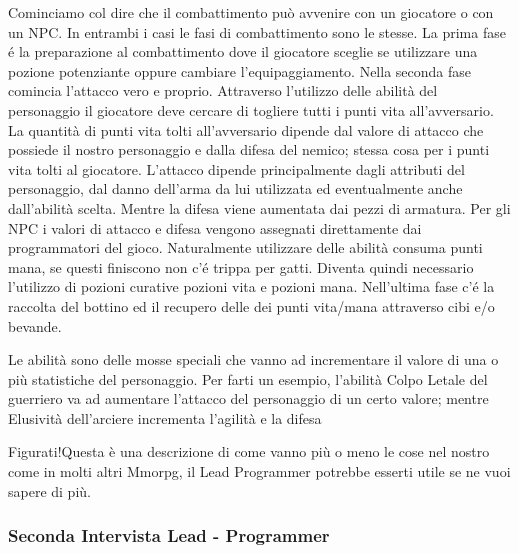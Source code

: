 \begin{description}[style=nextline]
	\item[Quando si combatte, cosa succede?] Cominciamo col dire che il combattimento pu\`{o} avvenire con un giocatore o con un NPC. In entrambi i casi le fasi di combattimento sono le stesse. La prima fase \'{e} la preparazione al combattimento dove il giocatore sceglie se utilizzare una pozione potenziante oppure cambiare l'equipaggiamento. Nella seconda fase comincia l'attacco vero e proprio. Attraverso l'utilizzo delle abilit\`{a} del personaggio il giocatore deve cercare di togliere tutti i punti vita all'avversario. La quantit\`{a} di punti vita tolti all'avversario dipende dal valore di attacco che possiede il nostro personaggio e dalla difesa del nemico; stessa cosa per i punti vita tolti al giocatore. L'attacco dipende principalmente dagli attributi del personaggio, dal danno dell'arma da lui utilizzata ed eventualmente anche dall'abilit\`{a} scelta. Mentre la difesa viene aumentata dai pezzi di armatura. Per gli NPC i valori di attacco e difesa vengono assegnati direttamente dai programmatori del gioco. Naturalmente utilizzare delle abilit\`{a} consuma punti mana, se questi finiscono non c'\'{e} trippa per gatti. Diventa quindi necessario l'utilizzo di pozioni curative pozioni vita e pozioni mana. Nell'ultima fase c'\'{e} la raccolta del bottino ed il recupero delle dei punti vita/mana attraverso cibi e/o bevande.
	
	\item[Le abilit\`{a} del personaggio, in pratica, cosa sono?]Le abilit\`{a} sono delle mosse speciali che vanno ad incrementare il valore di una o pi\`{u} statistiche del personaggio. Per farti un esempio, l'abilit\`{a} Colpo Letale del guerriero va ad aumentare l'attacco del personaggio di un certo valore; mentre Elusivit\`{a} dell'arciere incrementa l'agilit\`{a} e la difesa
	
	\item[Ti ringrazio per la disponibilit\`{a} e la completezza]Figurati!Questa è una descrizione di come vanno pi\`{u} o meno le cose nel nostro come in molti altri Mmorpg, il Lead Programmer potrebbe esserti utile se ne vuoi sapere di pi\`{u}.
	 

    \end{description}


\newpage 

\subsubsection{Seconda Intervista Lead - Programmer} 
\medskip

